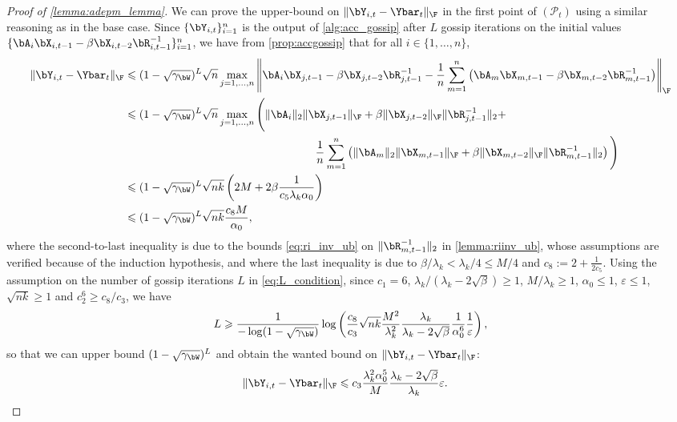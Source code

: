 \documentclass{article}
\theoremstyle{plain}
\theoremstyle{definition}
\theoremstyle{remark}
\begin{document}
\begin{proof}[Proof of \cref{lemma:adepm_lemma}]
  We can prove the upper-bound on $\Vert \bY_{i,t} - \Ybar_t \Vert_\F$ in the first point of $(\mathcal{P}_t)$ using a similar reasoning as in the base case. Since $\{\bY_{i,t}\}_{i=1}^n$ is the output of \cref{alg:acc_gossip} after $L$ gossip iterations on the initial values $\{\bA_i \bX_{i,t-1} - \beta \bX_{i,t-2} \bR_{i,t-1}^{-1}\}_{i=1}^n$, we have from \cref{prop:accgossip} that for all $i\in \{1, \dots, n\}$,
  \begin{align*}
    \Vert \bY_{i,t} - \Ybar_t \Vert_\F & \leqslant (1-\sqrt{\gamma_\bW})^L \sqrt{n} \max_{j=1, \dots, n} \left\Vert \bA_i \bX_{j,t-1} - \beta \bX_{j,t-2} \bR_{j,t-1}^{-1} - \frac{1}{n}\sum_{m=1}^n\left(\bA_m\bX_{m,t-1} - \beta \bX_{m,t-2} \bR_{m,t-1}^{-1}\right) \right\Vert_\F\\
    & \leqslant (1-\sqrt{\gamma_\bW})^L \sqrt{n} \max_{j=1, \dots, n} \Bigg( \Vert \bA_i \Vert_2 \Vert \bX_{j,t-1} \Vert_\F + \beta \Vert \bX_{j,t-2} \Vert_\F \Vert \bR_{j,t-1}^{-1} \Vert_2 + \\
    & \hspace{6cm} \frac{1}{n}\sum_{m=1}^n \left(\Vert \bA_m \Vert_2 \Vert \bX_{m,t-1} \Vert_\F + \beta \Vert \bX_{m,t-2} \Vert_\F \Vert \bR_{m, t-1}^{-1} \Vert_2 \right) \Bigg)\\
    & \leqslant (1-\sqrt{\gamma_\bW})^L \sqrt{nk} \left(2M + 2 \beta \frac{1}{c_5 \lambda_k \alpha_0} \right) \\
    & \leqslant (1-\sqrt{\gamma_\bW})^L \sqrt{nk}\frac{c_8 M}{\alpha_0},
  \end{align*}
  where the second-to-last inequality is due to the bounds \eqref{eq:ri_inv_ub} on $\Vert \bR_{m, t-1}^{-1} \Vert_2$ in \cref{lemma:riinv_ub}, whose assumptions are verified because of the induction hypothesis, and where the last inequality is due to $\beta/\lambda_k < \lambda_k/4 \leqslant M/4$ and $c_8 := 2 + \frac{1}{2c_5}$. Using the assumption on the number of gossip iterations $L$ in \eqref{eq:L_condition}, since $c_1 = 6$, $\lambda_k/(\lambda_k-2\sqrt{\beta}) \geqslant 1$, $M/\lambda_k \geqslant 1$, $\alpha_0 \leqslant 1$, $\varepsilon\leqslant 1$, $\sqrt{nk}\geqslant 1$ and $c_2^6 \geqslant c_8/c_3$, we have
  \begin{align*}
    L \geqslant \frac{1}{-\log(1-\sqrt{\gamma_\bW})} \log\left(\frac{c_8}{c_3}\sqrt{nk} \frac{M^2}{\lambda_k^2} \frac{\lambda_k}{\lambda_k-2\sqrt{\beta}}\frac{1}{\alpha_0^6} \frac{1}{\varepsilon}\right),
  \end{align*}
  so that we can upper bound $(1-\sqrt{\gamma_\bW})^L$ and obtain the wanted bound on $\Vert \bY_{i,t} - \Ybar_t \Vert_\F$:
  \begin{align*}
    \Vert \bY_{i,t} - \Ybar_t \Vert_\F & \leqslant c_3\frac{\lambda_k^2 \alpha_0^5}{M} \frac{\lambda_k-2\sqrt{\beta}}{\lambda_k}\varepsilon.
  \end{align*}


\end{proof}
\end{document}
